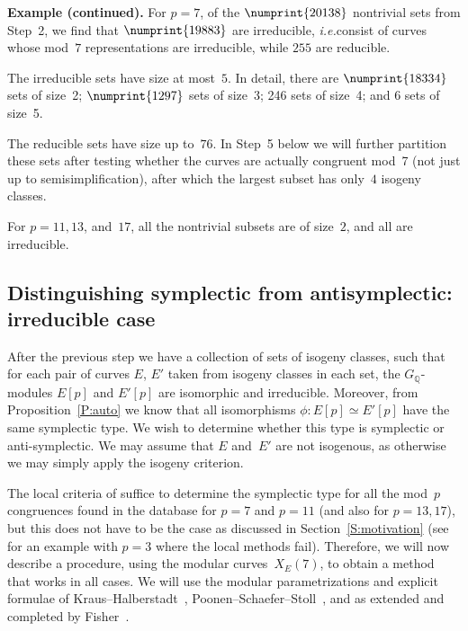 \documentclass[12pt, reqno]{amsart}
\newcommand{\Q}{\mathbb{Q}}
\numberwithin{equation}{section}
\theoremstyle{definition}
\theoremstyle{remark}
\begin{document}
{\bf Example (continued).} For $p=7$, of the $\numprint{20138}$
nontrivial sets from Step~2, we find that $\numprint{19883}$ are
irreducible, {\it i.e.}\@ consist of curves whose mod~$7$
representations are irreducible, while $255$ are reducible.

The irreducible sets have size at most~$5$.  In detail, there are
$\numprint{18334}$ sets of size~2; $\numprint{1297}$ sets of size~3;
246 sets of size~4; and 6 sets of size~5.

The reducible sets have size up to~$76$.  In Step~5 below we will
further partition these sets after testing whether the curves are
actually congruent mod~7 (not just up to semisimplification), after
which the largest subset has only~$4$ isogeny classes.


For $p=11, 13$, and~$17$, all the nontrivial subsets are of size~$2$,
and all are irreducible.

\subsection{Distinguishing symplectic from antisymplectic: irreducible case}
After the previous step we have a collection of sets of isogeny
classes, such that for each pair of curves $E$, $E'$ taken from
isogeny classes in each set, the $G_{\Q}$-modules $E[p]$ and $E'[p]$
are isomorphic and irreducible. Moreover, from
Proposition~\ref{P:auto} we know that all isomorphisms $\phi : E[p]
\simeq E'[p]$ have the same symplectic type. We wish to determine
whether this type is symplectic or anti-symplectic.  We may assume
that $E$ and~$E'$ are not isogenous, as otherwise we may simply apply
the isogeny criterion.

The local criteria of \cite{FKSym} suffice to determine the symplectic
type for all the mod~$p$ congruences found in the database for $p=7$
and $p=11$ (and also for $p=13, 17$), but this does not have to be
the case as discussed in Section~\ref{S:motivation} (see
\cite[Proposition~16]{FKSym} for an example with $p=3$ where the local
methods fail).  Therefore, we will now describe a procedure, using the
modular curves~$X_E(7)$, to obtain a method that works in all cases.
We will use the modular parametrizations and explicit formulae of
Kraus--Halberstadt~\cite{Halberstadt-Kraus-XE7},
Poonen--Schaefer--Stoll~\cite{PSS}, and as extended and completed by
Fisher~\cite{Fisher}.
\end{document}
